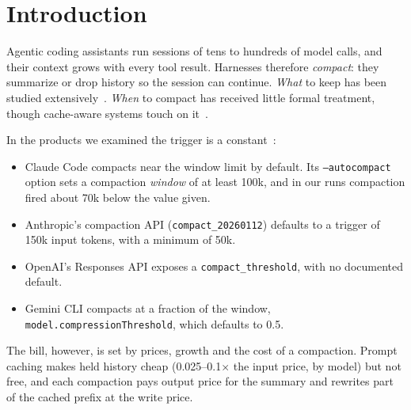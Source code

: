 \documentclass[11pt]{article}
\begin{document}
\begin{abstract}
In simulation, gating compactions on the predicted remaining session length is inert with learned predictors and worth at most 2 points even with an oracle. Steady-state savings are therefore a ceiling, not an expectation. The case for adaptive triggers is robustness across price regimes: a fixed 150k loses 29\% without caching.
\end{abstract}

\section{Introduction}
Agentic coding assistants run sessions of tens to hundreds of model calls, and their context grows with every tool result. Harnesses therefore \emph{compact}: they summarize or drop history so the session can continue. \emph{What} to keep has been studied extensively~\cite{complexitytrap,acon,tracer,compactiontheory}. \emph{When} to compact has received little formal treatment, though cache-aware systems touch on it~\cite{tokenpilot,cliff,infercept}.

In the products we examined the trigger is a constant~\cite{docs}:
\begin{itemize}
\item Claude Code compacts near the window limit by default. Its \texttt{--autocompact} option sets a compaction \emph{window} of at least 100k, and in our runs compaction fired about 70k below the value given.
\item Anthropic's compaction API (\texttt{compact\_20260112}) defaults to a trigger of 150k input tokens, with a minimum of 50k.
\item OpenAI's Responses API exposes a \texttt{compact\_threshold}, with no documented default.
\item Gemini CLI compacts at a fraction of the window, \texttt{model.compressionThreshold}, which defaults to 0.5.
\end{itemize}

The bill, however, is set by prices, growth and the cost of a compaction. Prompt caching makes held history cheap (0.025--0.1$\times$ the input price, by model) but not free, and each compaction pays output price for the summary and rewrites part of the cached prefix at the write price.
\end{document}
